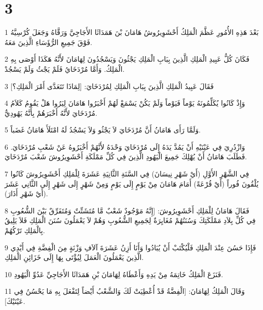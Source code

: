 \chapter{3}

\par 1 بَعْدَ هَذِهِ الأُمُورِ عَظَّمَ الْمَلِكُ أَحْشَوِيرُوشُ هَامَانَ بْنَ هَمَدَاثَا الأَجَاجِيَّ وَرَقَّاهُ وَجَعَلَ كُرْسِيَّهُ فَوْقَ جَمِيعِ الرُّؤَسَاءِ الَّذِينَ مَعَهُ.
\par 2 فَكَانَ كُلُّ عَبِيدِ الْمَلِكِ الَّذِينَ بِبَابِ الْمَلِكِ يَجْثُونَ وَيَسْجُدُونَ لِهَامَانَ لأَنَّهُ هَكَذَا أَوْصَى بِهِ الْمَلِكُ. وَأَمَّا مُرْدَخَايُ فَلَمْ يَجْثُ وَلَمْ يَسْجُدْ.
\par 3 فَقَالَ عَبِيدُ الْمَلِكِ الَّذِينَ بِبَابِ الْمَلِكِ لِمُرْدَخَايَ: [لِمَاذَا تَتَعَدَّى أَمْرَ الْمَلِكِ؟]
\par 4 وَإِذْ كَانُوا يُكَلِّمُونَهُ يَوْماً فَيَوْماً وَلَمْ يَكُنْ يَسْمَعْ لَهُمْ أَخْبَرُوا هَامَانَ لِيَرُوا هَلْ يَقُومُ كَلاَمُ مُرْدَخَايَ لأَنَّهُ أَخْبَرَهُمْ بِأَنَّهُ يَهُودِيٌّ.
\par 5 وَلَمَّا رَأَى هَامَانُ أَنَّ مُرْدَخَايَ لاَ يَجْثُو وَلاَ يَسْجُدُ لَهُ امْتَلَأَ هَامَانُ غَضَباً.
\par 6 وَازْدُرِيَ فِي عَيْنَيْهِ أَنْ يَمُدَّ يَدَهُ إِلَى مُرْدَخَايَ وَحْدَهُ لأَنَّهُمْ أَخْبَرُوهُ عَنْ شَعْبِ مُرْدَخَايَ. فَطَلَبَ هَامَانُ أَنْ يُهْلِكَ جَمِيعَ الْيَهُودِ الَّذِينَ فِي كُلِّ مَمْلَكَةِ أَحْشَوِيرُوشَ شَعْبَ مُرْدَخَايَ.
\par 7 فِي الشَّهْرِ الأَوَّلِ (أَيْ شَهْرِ نِيسَانَ) فِي السَّنَةِ الثَّانِيَةِ عَشَرَةَ لِلْمَلِكِ أَحْشَوِيرُوشَ كَانُوا يُلْقُونَ فُوراً (أَيْ قُرْعَةً) أَمَامَ هَامَانَ مِنْ يَوْمٍ إِلَى يَوْمٍ وَمِنْ شَهْرٍ إِلَى شَهْرٍ إِلَى الثَّانِي عَشَرَ (أَيْ شَهْرِ أَذَارَ).
\par 8 فَقَالَ هَامَانُ لِلْمَلِكِ أَحْشَوِيرُوشَ: [إِنَّهُ مَوْجُودٌ شَعْبٌ مَّا مُتَشَتِّتٌ وَمُتَفَرِّقٌ بَيْنَ الشُّعُوبِ فِي كُلِّ بِلاَدِ مَمْلَكَتِكَ وَسُنَنُهُمْ مُغَايِرَةٌ لِجَمِيعِ الشُّعُوبِ وَهُمْ لاَ يَعْمَلُونَ سُنَنَ الْمَلِكِ فَلاَ يَلِيقُ بِالْمَلِكِ تَرْكُهُمْ.
\par 9 فَإِذَا حَسُنَ عِنْدَ الْمَلِكِ فَلْيُكْتَبْ أَنْ يُبَادُوا وَأَنَا أَزِنُ عَشَرَةَ آلاَفِ وَزْنَةٍ مِنَ الْفِضَّةِ فِي أَيْدِي الَّذِينَ يَعْمَلُونَ الْعَمَلَ لِيُؤْتَى بِهَا إِلَى خَزَائِنِ الْمَلِكِ.
\par 10 فَنَزَعَ الْمَلِكُ خَاتِمَهُ مِنْ يَدِهِ وَأَعْطَاهُ لِهَامَانَ بْنِ هَمَدَاثَا الأَجَاجِيِّ عَدُوِّ الْيَهُودِ.
\par 11 وَقَالَ الْمَلِكُ لِهَامَانَ: [الْفِضَّةُ قَدْ أُعْطِيَتْ لَكَ وَالشَّعْبُ أَيْضاً لِتَفْعَلَ بِهِ مَا يَحْسُنُ فِي عَيْنَيْكَ].
